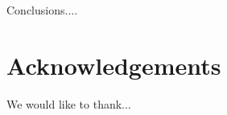 \documentclass[a4paper,fleqn,usenatbib]{mnras}
\begin{document}
Conclusions....

\section*{Acknowledgements}
We would like to thank...















\bsp	%
\label{lastpage}
\end{document}
